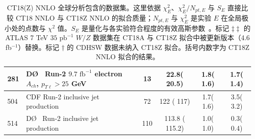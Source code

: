 \begin{table}[htbp]
\begin{tabular}{|l|lr|c|c|c|c|}
 281 & D\O~ Run-2 $9.7 \mbox{ fb}^{-1}$ electron $A_{ch}$, $p_{T\ell}>25$ GeV              & \cite{D0:2014kma}           &   13  &    22.8(  20.5) &   1.8( 1.6) &   1.7(  1.4)   \tabularnewline\hline
 504 & CDF Run-2 inclusive jet production                                                  & \cite{Aaltonen:2008eq}      &   72  &   122 ( 117) &   1.7( 1.6) &   3.5(  3.2)   \tabularnewline\hline
 514 & D\O~ Run-2 inclusive jet production                                                 & \cite{Abazov:2008ae}        &  110  &   113.8 ( 115.2) &   1.0( 1.0) &   0.3(  0.4)   \tabularnewline
\hline
\hline
\end{tabular}
\caption{CT18(Z) NNLO 全球分析包含的数据集。这里依据 $\chi^2_E$、$\chi^2_E/N_{pt, E}$ 与 $S_E$ 直接比较 CT18 NNLO 与 CT18Z NNLO 的拟合质量；$N_{pt, E}$ 与 $\chi^2_E$ 是实验 $E$ 在全局极小处的点数与 $\chi^2$ 值。$S_E$ 是量化与各实验符合程度的有效高斯参数~\cite{Lai:2010vv, Gao:2013xoa, Dulat:2013hea}。标记 $\ddagger\ddagger$ 的 ATLAS 7 TeV $35\mbox{ pb}^{-1}$ $W/Z$ 数据集在 CT18A 与 CT18Z 拟合中被更新版本（4.6 fb$^{-1}$）替换。标记 $\dagger$ 的 CDHSW 数据未纳入 CT18Z 拟合。括号内数字为 CT18Z NNLO 拟合的结果。
\label{tab:EXP_1} }
\end{table}
\endgroup



\begingroup

